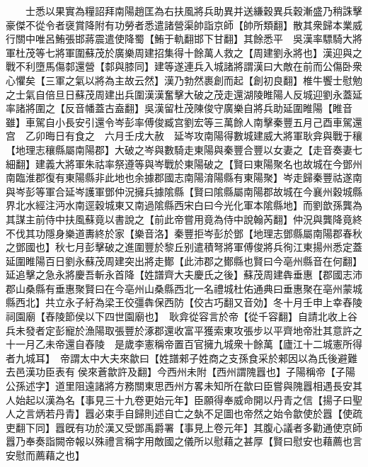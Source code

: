 　　士悉以果實為糧詔拜南陽趙匡為右扶風將兵助異并送縑穀異兵穀漸盛乃稍誅擊豪傑不從令者襃賞降附有功勞者悉遣諸營渠帥詣京師【帥所類翻】散其衆歸本業威行關中唯呂鮪張邯蔣震遣使降蜀【鮪于軌翻邯下甘翻】其餘悉平　吳漢率驃騎大將軍杜茂等七將軍圍蘇茂於廣樂周建招集得十餘萬人救之【周建劉永將也】漢迎與之戰不利墮馬傷䣛還營【䣛與膝同】建等遂連兵入城諸將謂漢曰大敵在前而公傷卧衆心懼矣【三軍之氣以將為主故云然】漢乃勃然裹創而起【創初良翻】椎牛饗士慰勉之士氣自倍旦日蘇茂周建出兵圍漢漢奮擊大破之茂走還湖陵睢陽人反城迎劉永蓋延率諸將圍之【反音幡蓋古盍翻】吳漢留杜茂陳俊守廣樂自將兵助延圍睢陽【睢音雖】車駕自小長安引還令岑彭率傅俊臧宫劉宏等三萬餘人南擊秦豐五月己酉車駕還宫　乙卯晦日有食之　六月壬戌大赦　延岑攻南陽得數城建威大將軍耿弇與戰于穰【地理志穰縣屬南陽郡】大破之岑與數騎走東陽與秦豐合豐以女妻之【走音奏妻七細翻】建義大將軍朱祜率祭遵等與岑戰於東陽破之【賢曰東陽聚名也故城在今鄧州南臨淮郡復有東陽縣非此地也余據郡國志南陽淯陽縣有東陽聚】岑走歸秦豐祜遂南與岑彭等軍合延岑護軍鄧仲況擁兵據隂縣【賢曰隂縣屬南陽郡故城在今襄州穀城縣界北水經注沔水南逕穀城東又南過隂縣西宋白曰今光化軍本隂縣地】而劉歆孫龔為其謀主前侍中扶風蘇竟以書說之【前此帝嘗用竟為侍中說翰芮翻】仲況與龔降竟終不伐其功隱身樂道夀終於家【樂音洛】秦豐拒岑彭於鄧【地理志鄧縣屬南陽郡春秋之鄧國也】秋七月彭擊破之進圍豐於黎丘别遣積弩將軍傅俊將兵徇江東揚州悉定蓋延圍睢陽百日劉永蘇茂周建突出將走鄼【此沛郡之鄼縣也賢曰今亳州縣音在何翻】延追擊之急永將慶吾斬永首降【姓譜齊大夫慶氏之後】蘇茂周建犇垂惠【郡國志沛郡山桑縣有垂惠聚賢曰在今亳州山桑縣西北一名禮城杜佑通典曰垂惠聚在亳州蒙城縣西北】共立永子紆為梁王佼彊犇保西防【佼古巧翻又音効】冬十月壬申上幸舂陵祠園廟【舂陵節侯以下四世園廟也】　耿弇從容言於帝【從千容翻】自請北收上谷兵未發者定彭寵於漁陽取張豐於涿郡還收富平獲索東攻張步以平齊地帝壯其意許之十一月乙未帝還自舂陵　是歲李憲稱帝置百官擁九城衆十餘萬【廬江十二城憲所得者九城耳】　帝謂太中大夫來歙曰【姓譜郲子姓商之支孫食采於郲因以為氏後避難去邑漢功臣表有侯來蒼歙許及翻】今西州未附【西州謂隗囂也】子陽稱帝【子陽公孫述字】道里阻遠諸將方務關東思西州方畧未知所在歙曰臣嘗與隗囂相遇長安其人始起以漢為名【事見三十九卷更始元年】臣願得奉威命開以丹青之信【揚子曰聖人之言炳若丹青】囂必束手自歸則述自亡之埶不足圖也帝然之始令歙使於囂【使疏吏翻下同】囂旣有功於漢又受鄧禹爵署【事見上卷元年】其腹心議者多勸通使京師囂乃奉奏詣闕帝報以殊禮言稱字用敵國之儀所以慰藉之甚厚【賢曰慰安也藉薦也言安慰而薦藉之也】

